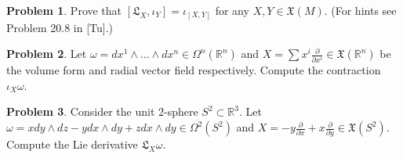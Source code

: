 \documentclass{amsart}
\newcommand{\+}[1]{\ensuremath{\mathbf{#1}}}
\newcommand{\R}{{\mathbb R}}
\theoremstyle{definition}
\newtheorem{prob}{Problem}
\begin{document}
\begin{prob}
Prove that $[\mathfrak{L}_X, \iota_Y] = \iota_{[X,Y]}$
for any $X,Y \in \mathfrak{X}(M)$.  (For hints
see Problem 20.8 in [Tu].)
\end{prob}

\begin{prob}
Let $\omega = dx^1 \wedge \ldots \wedge dx^n \in \Omega^n(\R^n)$
and 
$X = \sum x^i \frac{\partial}{\partial x^i} \in \mathfrak{X}(\R^n)$ 
be the volume form and radial vector field respectively.
Compute the contraction $\iota_X\omega$.
\end{prob}

\begin{prob}
Consider the unit $2$-sphere $S^2 \subset \R^3$.
 Let $\omega = x dy \wedge dz - y dx \wedge dy + z dx \wedge dy \in \Omega^2(S^2)$
 and $X = -y \frac{\partial}{\partial x} + x \frac{\partial}{\partial y} \in \mathfrak{X}(S^2)$.
 Compute the Lie derivative {\color{red}$\mathfrak{L}_X\omega$}.
\end{prob}
\end{document}

